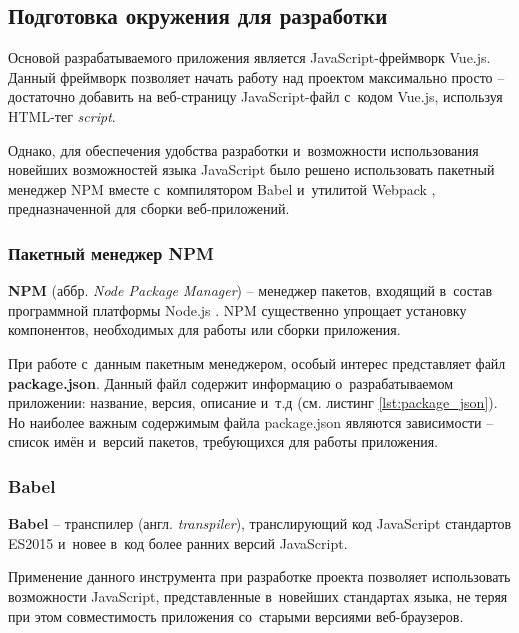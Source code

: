 
\subsection{Подготовка окружения для разработки}

Основой разрабатываемого приложения является JavaScript-фреймворк Vue.js. Данный фреймворк позволяет начать работу над проектом максимально просто -- достаточно добавить на веб-страницу JavaScript-файл с~кодом Vue.js, используя HTML-тег \emph{script}.

Однако, для обеспечения удобства разработки и~возможности использования новейших возможностей языка JavaScript было решено использовать пакетный менеджер NPM \cite{NPM} вместе с~компилятором Babel \cite{Babel} и~утилитой Webpack \cite{Webpack}, предназначенной для сборки веб-приложений.


\subsubsection{Пакетный менеджер NPM}

\textbf{NPM} (аббр. \emph{Node Package Manager}) -- менеджер пакетов, входящий в~состав программной платформы Node.js \cite{NodeJS}. NPM существенно упрощает установку компонентов, необходимых для работы или сборки приложения.

При работе с~данным пакетным менеджером, особый интерес представляет файл \textbf{package.json}. Данный файл содержит информацию о~разрабатываемом приложении: название, версия, описание и~т.д (см. листинг \ref{lst:package_json}). Но наиболее важным содержимым файла package.json являются зависимости -- список имён и~версий пакетов, требующихся для работы приложения.


\subsubsection{Babel}

\textbf{Babel} -- транспилер (англ. \emph{transpiler}), транслирующий код JavaScript стандартов ES2015 и~новее \cite{ecma262} в~код более ранних версий JavaScript.

Применение данного инструмента при разработке проекта позволяет использовать возможности JavaScript, представленные в~новейших стандартах языка, не теряя при этом совместимость приложения со~старыми версиями веб-браузеров.




